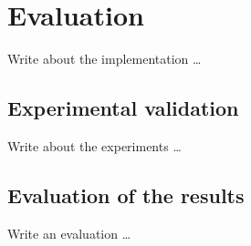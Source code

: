 \chapter{Evaluation}
\label{cha:evaluation}
\vspace{0.5 cm} 

Write about the implementation \dots

\vspace{0.5 cm} 
\section{Experimental validation}
\label{sec:expval}
\vspace{0.5 cm} 

Write about the experiments \dots


\vspace{0.5 cm} 
\section{Evaluation of the results}
\label{sec:evalres}
\vspace{0.5 cm} 

Write an evaluation \dots
